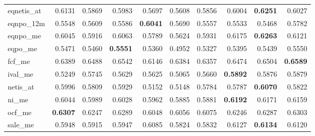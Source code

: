\begin{longtable}{>{\raggedright\arraybackslash}p{2.6cm}rrrrrrrrr}
eqnetis\_at & 0.6131 & 0.5869 & 0.5983 & 0.5697 & 0.5608 & 0.5856 & 0.6004 & \textbf{\cellcolor{blue!10}0.6251} & 0.6027 \\
eqnpo\_12m & 0.5548 & \cellcolor{blue!10}0.5609 & \cellcolor{blue!10}0.5586 & \textbf{\cellcolor{blue!10}0.6041} & \cellcolor{blue!10}0.5690 & \cellcolor{blue!10}0.5557 & 0.5533 & 0.5468 & \cellcolor{blue!10}0.5782 \\
eqnpo\_me & 0.6045 & 0.5916 & \cellcolor{blue!10}0.6063 & 0.5789 & 0.5624 & 0.5931 & \cellcolor{blue!10}0.6175 & \textbf{\cellcolor{blue!10}0.6263} & \cellcolor{blue!10}0.6121 \\
eqpo\_me & 0.5471 & 0.5460 & \textbf{\cellcolor{blue!10}0.5551} & 0.5360 & 0.4952 & 0.5327 & 0.5395 & 0.5439 & \cellcolor{blue!10}0.5550 \\
fcf\_me & 0.6389 & \cellcolor{blue!10}0.6488 & \cellcolor{blue!10}0.6542 & 0.6146 & 0.6384 & 0.6357 & \cellcolor{blue!10}0.6474 & \cellcolor{blue!10}0.6504 & \textbf{\cellcolor{blue!10}0.6589} \\
ival\_me & 0.5249 & \cellcolor{blue!10}0.5745 & \cellcolor{blue!10}0.5629 & \cellcolor{blue!10}0.5625 & 0.5065 & \cellcolor{blue!10}0.5660 & \textbf{\cellcolor{blue!10}0.5892} & \cellcolor{blue!10}0.5876 & \cellcolor{blue!10}0.5879 \\
netis\_at & 0.5996 & 0.5809 & 0.5929 & 0.5152 & 0.5148 & 0.5784 & 0.5787 & \textbf{\cellcolor{blue!10}0.6070} & 0.5822 \\
ni\_me & 0.6044 & 0.5989 & 0.6028 & 0.5962 & 0.5885 & 0.5881 & \textbf{\cellcolor{blue!10}0.6192} & \cellcolor{blue!10}0.6171 & \cellcolor{blue!10}0.6159 \\
ocf\_me & \textbf{0.6307} & 0.6247 & 0.6289 & 0.6048 & 0.6056 & 0.6075 & 0.6246 & 0.6287 & 0.6303 \\
sale\_me & 0.5948 & 0.5915 & 0.5947 & \cellcolor{blue!10}0.6085 & 0.5824 & 0.5832 & \cellcolor{blue!10}0.6127 & \textbf{\cellcolor{blue!10}0.6134} & \cellcolor{blue!10}0.6120 \\
\hline
\end{longtable}
\endgroup

